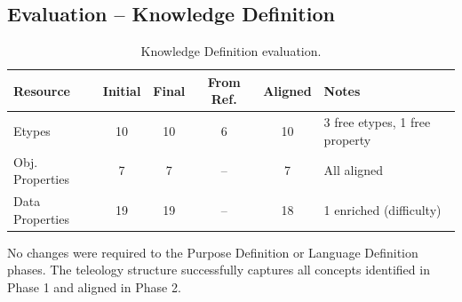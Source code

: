 \subsection{Evaluation -- Knowledge Definition}

\begin{table}[h!]
\centering
\small
\begin{tabular}{|l|c|c|c|c|l|}
\hline
\textbf{Resource} & \textbf{Initial} & \textbf{Final} & \textbf{From Ref.} & \textbf{Aligned} & \textbf{Notes} \\
\hline
Etypes & 10 & 10 & 6 & 10 & 3 free etypes, 1 free property \\
Obj. Properties & 7 & 7 & -- & 7 & All aligned \\
Data Properties & 19 & 19 & -- & 18 & 1 enriched (difficulty) \\
\hline
\end{tabular}
\caption{Knowledge Definition evaluation.}
\end{table}

\noindent No changes were required to the Purpose Definition or Language Definition phases. The teleology structure successfully captures all concepts identified in Phase 1 and aligned in Phase 2.
